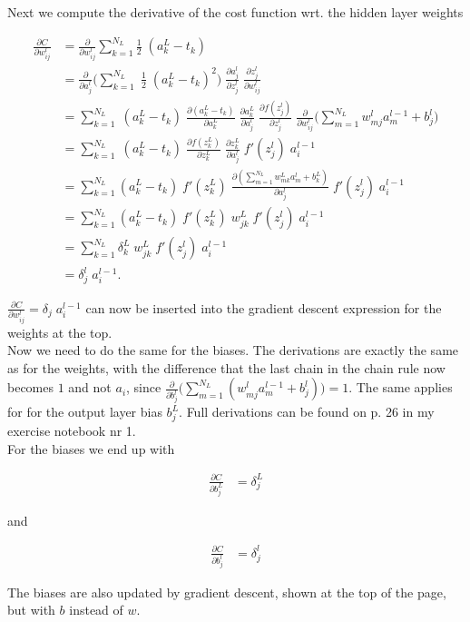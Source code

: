 \documentclass[a4paper, 12pt]{article}
\begin{document}
Next we compute the derivative of the cost function wrt. the hidden layer weights

\begin{align*}
\frac{\partial C}{\partial w_{ij}^l} &= \frac{\partial}{\partial w_{ij}^l} \sum_{k=1}^{N_L} \frac{1}{2} \;(a_k^L - t_k)\\
&= \frac{\partial}{\partial a_j^l}\Big( \sum_{k=1}^{N_L}\; \frac{1}{2}\; (a_k^L - t_k)^2 \Big) \;\frac{\partial a_j^l}{\partial z_j^l} \; \frac{\partial z_j^l}{\partial w_{ij}^l}\\
&= \sum_{k=1}^{N_L} \;(a_k^L - t_k) \; \frac{\partial (a_k^L - t_k)}{\partial a_k^L} \; \frac{\partial a_k^L}{\partial a_j^l}\; \frac{\partial f(z_j^l)}{\partial z_j^l} \; \frac{\partial}{\partial w_{ij}^l} \Big(\sum_{m=1}^{N_L} w_{mj}^l a_m^{l-1} + b_j^l\Big)\\
&= \sum_{k=1}^{N_L} \;(a_k^L - t_k)\; \frac{\partial f(z_k^L)}{\partial z_k^L}\; \frac{\partial z_k^L}{\partial a_j^l}\; f'(z_j^l)\; a_i^{l-1}\\
&= \sum_{k=1}^{N_L} (a_k^L - t_k)\; f'(z_k^L)\; \frac{\partial (\sum_{m=1}^{N_L} w_{mk}^L a_m^l + b_k^L)}{\partial a_j^l}\; f'(z_j^l)\; a_i^{l-1}\\
&= \sum_{k=1}^{N_L} (a_k^L - t_k)\; f'(z_k^L)\;w_{jk}^L\; f'(z_j^l)\; a_i^{l-1}\\
&= \sum_{k=1}^{N_L} \delta_k^L \;w_{jk}^L\; f'(z_j^l)\; a_i^{l-1}\\
&= \delta_j^l\; a_i^{l-1}.
\end{align*}

$\frac{\partial C}{\partial w_{ij}^l} = \delta_j\; a_i^{l-1}$ can now be inserted into the gradient descent expression for the weights at the top.\\

Now we need to do the same for the biases. The derivations are exactly the same as for the weights, with the difference that the last chain in the chain rule now becomes $1$ and not $a_i$, since $\frac{\partial}{\partial b_j^l}\Big(\sum_{m=1}^{N_L} (w_{mj}^l a_m^{l-1} + b_j^l)\Big) = 1$. The same applies for for the output layer bias $b_j^L$. Full derivations can be found on p. 26 in my exercise notebook nr 1.\\ 

For the biases we end up with

\begin{align}
	\frac{\partial C}{\partial b_j^L} &= \delta_j^L
\end{align}

and 

\begin{align}
	\frac{\partial C}{\partial b_j^l} &= \delta_j^l
\end{align}

The biases are also updated by gradient descent, shown at the top of the page, but with $b$ instead of $w$. 
\end{document}
